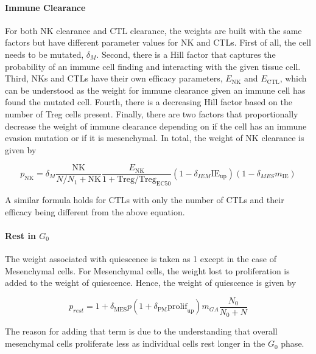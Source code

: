 \documentclass[11pt, preprint]{article}
\begin{document}
\paragraph{Immune Clearance}
For both NK clearance and CTL clearance, the weights are built with the same factors but have different parameter values for NK and CTLs.
First of all, the cell needs to be mutated, $\delta_M$.
Second, there is a Hill factor that captures the probability of an immune cell finding and interacting with the given tissue cell.
Third, NKs and CTLs have their own efficacy parameters, $E_{\text{NK}}$ and $E_{\text{CTL}}$, which can be understood as the weight for immune clearance given an immune cell has found the mutated cell.
Fourth, there is a decreasing Hill factor based on the number of Treg cells present.
Finally, there are two factors that proportionally decrease the weight of immune clearance depending on if the cell has an immune evasion mutation or if it is mesenchymal.
In total, the weight of NK clearance is given by

$$ p_{\text{NK}} =\delta_M \frac{\text{NK}}{N/N_{1}+\text{NK}}  \frac{E_{\text{NK}}}{1+\text{Treg}/\text{Treg}_{\text{EC50}}} (1-\delta_{IEM}\text{IE}_{\text{up}})(1-\delta_{MES}m_{\text{IE}}) $$

A similar formula holds for CTLs with only the number of CTLs and their efficacy being different from the above equation.


\paragraph{Rest in $G_0$} 
The weight associated with quiescence is taken as 1 except in the case of Mesenchymal cells.
For Mesenchymal cells, the weight lost to proliferation is added to the weight of quiescence.
Hence, the weight of quiescence is given by

$$ p_{rest} = 1 + \delta_{\text{MES}}p(1+\delta_{\text{PM}}\text{prolif}_{\text{up}})m_{GA}\frac{N_0}{N_0+N} $$ 

The reason for adding that term is due to the understanding that overall mesenchymal cells proliferate less as individual cells rest longer in the $G_0$ phase.
\end{document}
